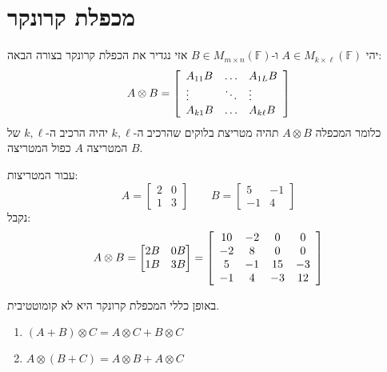 \documentclass{tstextbook}
\begin{document}
\section{מכפלת קרונקר}

\begin{definition}
יהי \(A \in M_{k\times \ell}\left( \mathbb{F}  \right)\) ו-\(B \in M_{m\times n}\left( \mathbb{F}  \right)\) אזי נגדיר את הכפלת קרונקר בצורה הבאה:
$$A\otimes B={\left[\begin{array}{l l l}{A_{11}B}&{\ldots}&{A_{1L}B}\\ {\vdots}&{\ddots}&{\vdots}\\ {A_{k1}B}&{\ldots}&{A_{k\ell}B}\end{array}\right]}$$
כלומר המכפלה \(A\otimes B\) תהיה מטריצת בלוקים שהרכיב ה-\(k,\ell\) יהיה הרכיב ה-\(k,\ell\) של המטריצה \(A\) כפול המטריצה \(B\).

\end{definition}
\begin{example}
עבור המטריצות:
$$A=\begin{bmatrix}2 & 0 \\1 & 3\end{bmatrix}\qquad B=\begin{bmatrix}5 & -1 \\-1 & 4
\end{bmatrix}$$
נקבל:
$$A\otimes B=\begin{bmatrix}2B & 0B \\1B & 3B
\end{bmatrix}=\left[\begin{array}{c c c c}{{10}}&{{-2}}&{{0}}&{{0}}\\ {{-2}}&{{8}}&{{0}}&{{0}}\\ {{5}}&{{-1}}&{{15}}&{{-3}}\\  {{-1}}&{{4}}&{{-3}}&{{12}}\end{array}\right]$$

\end{example}
\begin{remark}
באופן כללי המכפלת קרונקר היא לא קומוטטיבית.

\end{remark}
\begin{proposition}[פילוגיות]
  \begin{enumerate}
    \item \((A+B)\otimes C=A\otimes C+B\otimes C\)


    \item \(A\otimes(B+C)=A\otimes B+A\otimes C\)


  \end{enumerate}
\end{proposition}
\end{document}
